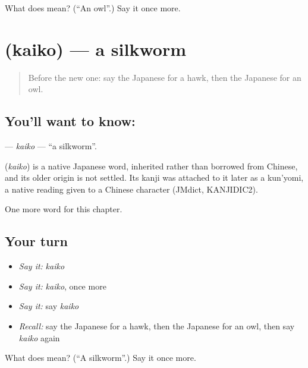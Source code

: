 \begin{tcolorbox}[breakable,colback=teal!4,colframe=teal!35!black,title={Before you move on}]
What does  mean? (\textquotedblleft{}An owl\textquotedblright{}.) Say it once more.
\end{tcolorbox}
\section[\texorpdfstring{\ja{かいこ} (kaiko)}{かいこ (kaiko)}]{ (kaiko) — a silkworm}

\label{lesson:JA-C109-kaiko}



\begin{quote}
Before the new one: say the Japanese for a hawk, then the Japanese for an owl.
\end{quote}

\subsection*{You'll want to know: }
\textbf{} — \emph{kaiko} — \textquotedblleft{}a silkworm\textquotedblright{}.

\begin{cousinweb}
\textbf{} (\emph{kaiko}) is a native Japanese word, inherited rather than borrowed from Chinese, and its older origin is not settled. Its kanji was attached to it later as a kun'yomi, a native reading given to a Chinese character (JMdict, KANJIDIC2).
\end{cousinweb}

\begin{grammarlens}[title={What you've built}]
One more word for this chapter.
\end{grammarlens}

\subsection*{Your turn}
\begin{itemize}
\raggedright
  \item \emph{Say it:} \emph{kaiko}
  \item \emph{Say it:} \emph{kaiko}, once more
  \item \emph{Say it:} say \emph{kaiko}
  \item \emph{Recall:} say the Japanese for a hawk, then the Japanese for an owl, then say \emph{kaiko} again
\end{itemize}

\begin{tcolorbox}[breakable,colback=teal!4,colframe=teal!35!black,title={Before you move on}]
What does  mean? (\textquotedblleft{}A silkworm\textquotedblright{}.) Say it once more.
\end{tcolorbox}
